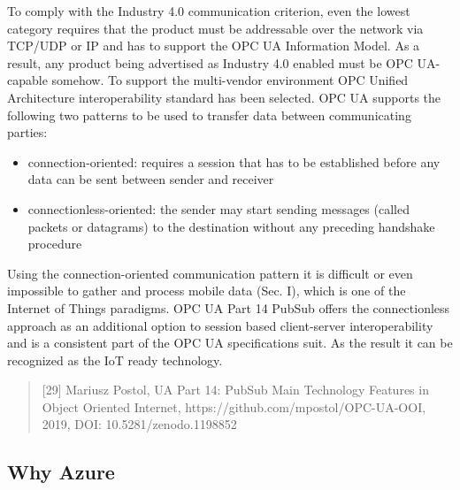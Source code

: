 \documentclass[
]{article}
\providecommand{\tightlist}{%
  \setlength{\itemsep}{0pt}\setlength{\parskip}{0pt}}
\begin{document}
To comply with the Industry 4.0 communication criterion, even the lowest
category requires that the product must be addressable over the network
via TCP/UDP or IP and has to support the OPC UA Information Model. As a
result, any product being advertised as Industry 4.0 enabled must be OPC
UA-capable somehow. To support the multi-vendor environment OPC Unified
Architecture interoperability standard has been selected. OPC UA
supports the following two patterns to be used to transfer data between
communicating parties:

\begin{itemize}
\tightlist
\item
  connection-oriented: requires a session that has to be established
  before any data can be sent between sender and receiver
\item
  connectionless-oriented: the sender may start sending messages (called
  packets or datagrams) to the destination without any preceding
  handshake procedure
\end{itemize}

Using the connection-oriented communication pattern it is difficult or
even impossible to gather and process mobile data (Sec. I), which is one
of the Internet of Things paradigms. OPC UA Part 14 PubSub offers the
connectionless approach as an additional option to session based
client-server interoperability and is a consistent part of the OPC UA
specifications suit. As the result it can be recognized as the IoT ready
technology.

\begin{quote}
{[}29{]} Mariusz Postol, UA Part 14: PubSub Main Technology Features in
Object Oriented Internet, https://github.com/mpostol/OPC-UA-OOI, 2019,
DOI: 10.5281/zenodo.1198852
\end{quote}

\hypertarget{why-azure}{%
\subsection{Why Azure}\label{why-azure}}
\end{document}
